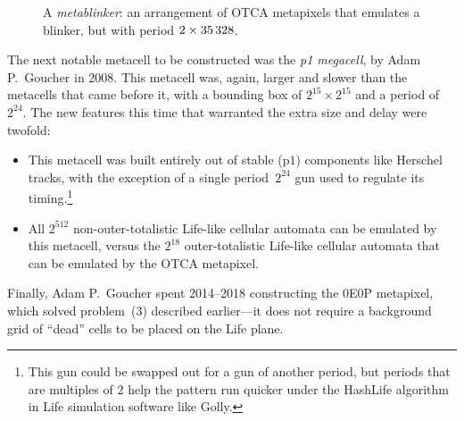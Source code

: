 \begin{figure}[!htb]
	\centering
	\caption{A \emph{metablinker}: an arrangement of OTCA metapixels that emulates a blinker, but with period $2 \times 35{\,}328$.}\label{fig:metablinker}
\end{figure}

The next notable metacell to be constructed was the \emph{p1 megacell}, by Adam P.~Goucher in 2008. This metacell was, again, larger and slower than the metacells that came before it, with a bounding box of $2^{15} \times 2^{15}$ and a period of $2^{24}$. The new features this time that warranted the extra size and delay were twofold:\smallskip

\begin{itemize}
	\item This metacell was built entirely out of stable (p$1$) components like Herschel tracks, with the exception of a single period~$2^{24}$ gun used to regulate its timing.\footnote{This gun could be swapped out for a gun of another period, but periods that are multiples of $2$ help the pattern run quicker under the HashLife algorithm in Life simulation software like Golly.}\smallskip
	
	\item All $2^{512}$ non-outer-totalistic Life-like cellular automata can be emulated by this metacell, versus the $2^{18}$ outer-totalistic Life-like cellular automata that can be emulated by the OTCA metapixel.\smallskip%
\end{itemize}


Finally, Adam P.~Goucher spent 2014--2018 constructing the 0E0P metapixel, which solved problem~(3) described earlier---it does not require a background grid of ``dead'' cells to be placed on the Life plane.


